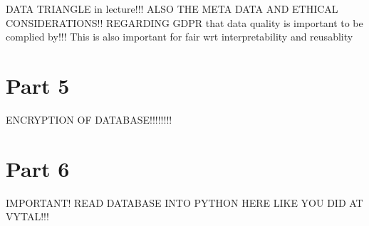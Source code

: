 \documentclass[a4paper]{article}
\begin{document}
DATA TRIANGLE in lecture!!!
ALSO THE META DATA AND ETHICAL CONSIDERATIONS!! REGARDING GDPR that data quality is important to be complied by!!! This is also important for fair wrt interpretability and reusablity
\section{Part 5}
ENCRYPTION OF DATABASE!!!!!!!!





\section{Part 6}
IMPORTANT! READ DATABASE INTO PYTHON HERE LIKE YOU DID AT VYTAL!!!
\end{document}
